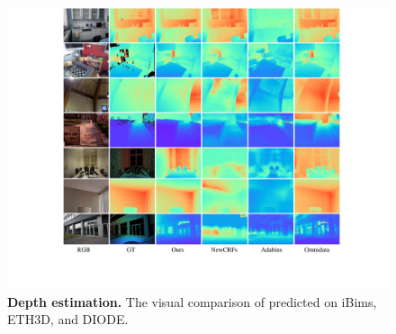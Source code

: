 \begin{figure}[]
\centering
\includegraphics[width=1\textwidth]{./files/supp_depth_1.pdf}
\caption{\textbf{Depth estimation.} The visual comparison of predicted on iBims, ETH3D, and DIODE.}
\label{fig: depth_cmp1.}
\end{figure}



